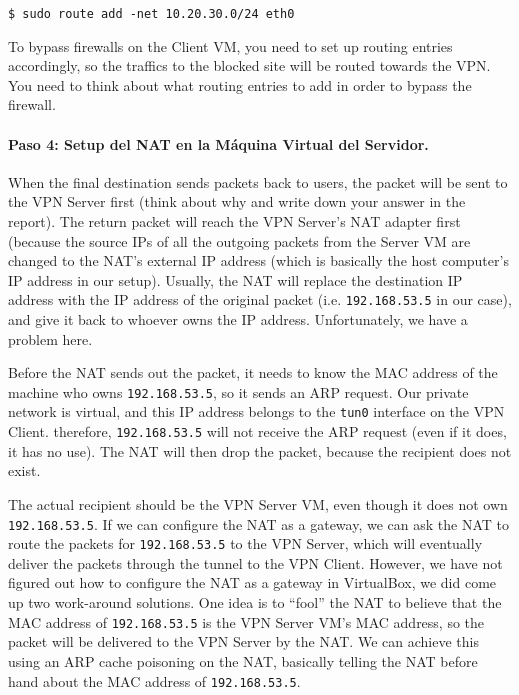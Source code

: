 \begin{lstlisting}
$ sudo route add -net 10.20.30.0/24 eth0
\end{lstlisting}

To bypass firewalls on the Client VM, you need to set up 
routing entries accordingly, so the traffics to the blocked site
will be routed towards the VPN. You need to think about what 
routing entries to add in order to bypass the firewall. 



\paragraph{Paso 4: Setup del NAT en la Máquina Virtual del Servidor.}
When the final destination sends packets back to users, the packet
will be sent to the VPN Server first (think about why and write down your answer 
in the report). The return packet will reach the VPN Server's NAT
adapter first (because the source IPs of all  the outgoing
packets from the Server VM are changed to the NAT's external IP address (which is basically the host computer's IP
address in our setup). Usually, the NAT will replace the destination IP address with the IP
address of the original packet (i.e. \texttt{192.168.53.5} in our case), and give it back to whoever owns
the IP address.  Unfortunately, we have a problem here.


Before the NAT sends out the packet, it needs to know the MAC address of the machine who owns
\texttt{192.168.53.5}, so it sends an ARP request. Our private network is virtual, and 
this IP address belongs to the \texttt{tun0} interface on the VPN Client.  
therefore, \texttt{192.168.53.5} will not receive the ARP request (even if it does, it has no
use). The NAT will then drop the packet, because the recipient does not exist.


The actual recipient should be the VPN Server VM, even though it does not own 
\texttt{192.168.53.5}.  If
we can configure the NAT as a gateway, we can ask the NAT to route the packets for
\texttt{192.168.53.5} to 
the VPN Server, which will eventually deliver the packets through the tunnel to the VPN Client. However,
we have not figured out how to configure the NAT as a gateway in VirtualBox, we did
come up two work-around solutions. One idea is to ``fool'' the NAT to believe that the MAC address of
\texttt{192.168.53.5} is the VPN Server VM's MAC address, so the packet will be delivered to
the VPN Server by the NAT. We can achieve this using an ARP cache poisoning on the NAT, basically telling the
NAT before hand about the MAC address of \texttt{192.168.53.5}.

